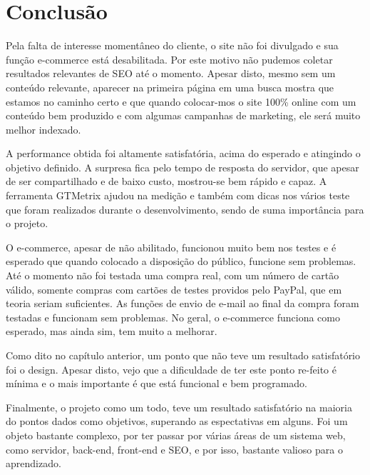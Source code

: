 \chapter{Conclusão}

Pela falta de interesse momentâneo do cliente, o site não foi divulgado e sua função e-commerce está desabilitada. Por este motivo não pudemos coletar resultados relevantes de SEO até o momento. Apesar disto, mesmo sem um conteúdo relevante, aparecer na primeira página em uma busca mostra que estamos no caminho certo e que quando colocar-mos o site 100\% online com um conteúdo bem produzido e com algumas campanhas de marketing, ele será muito melhor indexado.

A performance obtida foi altamente satisfatória, acima do esperado e atingindo o objetivo definido. A surpresa fica pelo tempo de resposta do servidor, que apesar de ser compartilhado e de baixo custo, mostrou-se bem rápido e capaz. A ferramenta GTMetrix ajudou na medição e também com dicas nos vários teste que foram realizados durante o desenvolvimento, sendo de suma importância para o projeto.

O e-commerce, apesar de não abilitado, funcionou muito bem nos testes e é esperado que quando colocado a disposição do público, funcione sem problemas. Até o momento não foi testada uma compra real, com um número de cartão válido, somente compras com cartões de testes providos pelo PayPal, que em teoria seriam suficientes. As funções de envio de e-mail ao final da compra foram testadas e funcionam sem problemas. No geral, o e-commerce funciona como esperado, mas ainda sim, tem muito a melhorar.

Como dito no capítulo anterior, um ponto que não teve um resultado satisfatório foi o design. Apesar disto, vejo que a dificuldade de ter este ponto re-feito é mínima e o mais importante é que está funcional e bem programado.

Finalmente, o projeto como um todo, teve um resultado satisfatório na maioria do pontos dados como objetivos, superando as espectativas em alguns. Foi um objeto bastante complexo, por ter passar por várias áreas de um sistema web, como servidor, back-end, front-end e SEO, e por isso, bastante valioso para o aprendizado.
